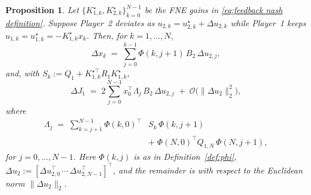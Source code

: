 \documentclass[letterpaper, 10 pt, conference]{ieeeconf}  %
\newtheorem{proposition}{\textbf{Proposition}}
\begin{document}
\begin{proposition}\label{prop:first_order}
Let $\{K^\star_{1,k}, K^\star_{2,k}\}_{k=0}^{N-1}$ be the FNE gains in \eqref{eq:feedback nash definition}. Suppose Player~2 deviates as $u_{2,k}=u^\star_{2,k}+\Delta u_{2,k}$ while Player~1 keeps $u_{1,k}=u^\star_{1,k}=-K^\star_{1,k}x_k$. Then, for $k=1,\dots,N$,
\begin{equation}\label{eq:dx_formula}
\Delta x_k \;=\; \sum_{j=0}^{k-1} \Phi(k,j+1)\,B_2\,\Delta u_{2,j},
\end{equation}
and, with $S_k := Q_1 + K_{1,k}^{\star\top} R_1 K^\star_{1,k}$,
\begin{equation}\label{eq:DJ_linear}
\Delta J_1 \;=\; 2 \sum_{j=0}^{N-1} x_0^\top \Lambda_j \,B_2\,\Delta u_{2,j} \;+\; \mathcal{O}\!\big(\|\Delta u_2\|_2^2\big),
\end{equation}
where
\begin{equation}\label{eq:Lambda_j}
\begin{aligned}
    \Lambda_j \;=\; \sum_{k=j+1}^{N-1} \Phi(k,0)^\top &S_k \,\Phi(k,j+1) \\
    \;&+\; \Phi(N,0)^\top Q_{1,N}\,\Phi(N,j+1),
\end{aligned}
\end{equation}
for $j=0,\dots,N-1$.
Here $\Phi(k,j)$ is as in Definition~\ref{def:phi}, $\Delta u_2:=[\Delta u_{2,0}^\top\,\cdots\,\Delta u_{2,N-1}^\top]^\top$, and
the remainder is with respect to the Euclidean norm $\|\Delta u_2\|_2$.
\end{proposition}
\end{document}
